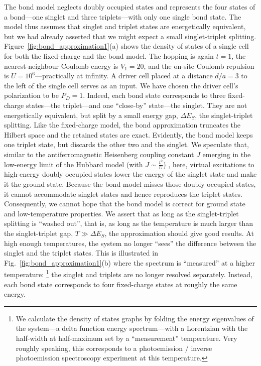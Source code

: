 The bond model neglects doubly occupied states and represents the four states of
a bond---one singlet and three triplets---with only one single bond state. The
model thus assumes that singlet and triplet states are energetically equivalent,
but we had already asserted that we might expect a small singlet-triplet
splitting. Figure~\ref{fig:bond_approximation1}(a) shows the density of states
of a single  cell for both the fixed-charge and the bond model. The
hopping is again $t=1$, the nearest-neighbour Coulomb energy is $V_1 = 20$, and
the on-site Coulomb repulsion is $U = 10^6$---practically at infinity. A driver
cell placed at a distance $d/a = 3$ to the left of the single cell serves as an
input. We have chosen the driver cell's polarization to be $P_D = 1$. Indeed,
each bond state corresponds to three fixed-charge states---the triplet---and one
``close-by'' state---the singlet. They are not energetically equivalent, but
split by a small energy gap, $\Delta E_S$, the singlet-triplet splitting. Like
the fixed-charge model, the bond approximation truncates the Hilbert space and
the retained states are exact. Evidently, the bond model keeps one triplet
state, but discards the other two and the singlet. We speculate that, similar to
the antiferromagnetic Heisenberg coupling constant $J$ emerging in the
low-energy limit of the Hubbard model (with $J \sim \frac{t^2}{U}$)
\cite{Auerbach}, here, virtual excitations to high-energy doubly occupied states
lower the energy of the singlet state and make it the ground state. Because the
bond model misses those doubly occupied states, it cannot accommodate singlet
states and hence reproduces the triplet states. Consequently, we cannot hope
that the bond model is correct for ground state and low-temperature properties.
We assert that as long as the singlet-triplet splitting is ``washed out'', that
is, as long as the temperature is much larger than the singlet-triplet gap, $T
\gg \Delta E_S$, the approximation should give good results. At high enough
temperatures, the system no longer ``sees'' the difference between the singlet
and the triplet states. This is illustrated in
Fig.~\ref{fig:bond_approximation1}(b) where the spectrum is ``measured'' at a
higher temperature:%
%
\footnote{
We calculate the density of states graphs by folding the energy
eigenvalues of the system---a delta function energy spectrum---with a Lorentzian
with the half-width at half-maximum set by a ``measurement'' temperature. Very
roughly speaking, this corresponds to a photoemission / inverse photoemission
spectroscopy experiment at this temperature.
}
%
the singlet and triplets are no longer resolved separately. Instead, each bond
state corresponds to four fixed-charge states at roughly the same energy.

